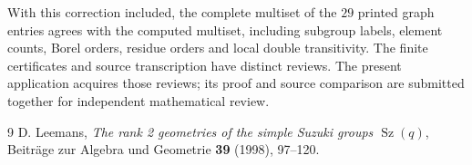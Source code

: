 \documentclass[11pt]{article}
\newcommand{\Sz}{\operatorname{Sz}}
\begin{document}
With this correction included, the complete multiset of the $29$
printed graph entries agrees with the computed multiset, including subgroup
labels, element counts, Borel orders, residue orders and local double
transitivity. The finite certificates and source transcription have distinct reviews.
The present application acquires those reviews; its proof and source
comparison are submitted together for independent mathematical review.

\begin{thebibliography}{9}
 D. Leemans, \emph{The rank 2 geometries of the simple Suzuki
groups $\Sz(q)$}, Beitr\"age zur Algebra und Geometrie \textbf{39}
(1998), 97--120.
\end{thebibliography}
\end{document}
